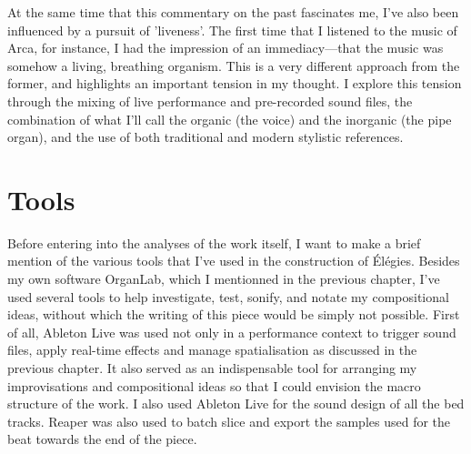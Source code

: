 \documentclass[12pt,twoside,maitrise]{dms_ks}
\theoremstyle{definition}
\begin{document}
At the same time that this commentary on the past fascinates me, I've also been influenced by a pursuit of 'liveness'. 
The first time that I listened to the music of Arca, for instance, I had the impression of an immediacy---that the music was somehow a living, breathing organism. 
This is a very different approach from the former, and highlights an important tension in my thought. 
I explore this tension through the mixing of live performance and pre-recorded sound files, the combination of what I'll call the organic (the voice) and the inorganic (the pipe organ), and the use of both traditional and modern stylistic references.

\section{Tools}

Before entering into the analyses of the work itself, I want to make a brief mention of the various tools that I've used in the construction of Élégies. 
Besides my own software OrganLab, which I mentionned in the previous chapter, I've used several tools to help investigate, test, sonify, and notate my compositional ideas, without which the writing of this piece would be simply not possible. 
First of all, Ableton Live was used not only in a performance context to trigger sound files, apply real-time effects and manage spatialisation as discussed in the previous chapter. 
It also served as an indispensable tool for arranging my improvisations and compositional ideas so that I could envision the macro structure of the work. 
I also used Ableton Live for the sound design of all the bed tracks. 
Reaper was also used to batch slice and export the samples used for the beat towards the end of the piece.
\end{document}
